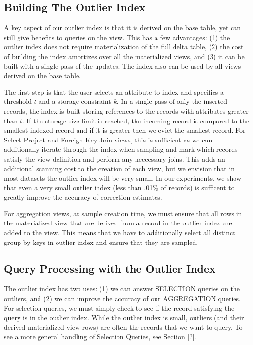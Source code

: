 \subsection{Building The Outlier Index}
A key aspect of our outlier index is that it is derived on the base table, yet 
can still give benefits to queries on the view.
This has a few advantages: (1) the outlier index does not require materialization of the full delta table,
(2) the cost of building the index amortizes over all the materialized views, and (3) it can be built with a 
single pass of the updates.
The index also can be used by all views derived on the base table.

The first step is that the user selects an attribute to index and specifies a threshold $t$ and a storage constraint $k$.
In a single pass of only the inserted records, the index is built storing references to the records with attributes greater than $t$.
If the storage size limit is reached, the incoming record is compared to the smallest indexed record and if it is greater then we evict the smallest record.
For Select-Project and Foreign-Key Join views, this is sufficient as we can additionally iterate through the index when sampling and mark 
which records satisfy the view definition and perform any neccessary joins. 
This adds an additional scanning cost to the creation of each view, but we envision that in most datasets the outlier index will be
very small.
In our experiments, we show that even a very small outlier index (less than .01\% of records) is sufficent to greatly improve the accuracy of
correction estimates.

For aggregation views, at sample creation time, we must ensure that all rows in the materialized view that are derived from a record in the outlier index are added to the view. 
This means that we have to additionally select all distinct group by keys in outlier index and ensure that they are sampled.

\subsection{Query Processing with the Outlier Index}
The outlier index has two uses: (1) we can answer SELECTION queries on the outliers, 
and (2) we can improve the accuracy of our AGGREGATION queries.
For selection queries, we must simply check to see if the record satisfying the query is in the outlier index.
While the outlier index is small, outliers (and their derived materialized view rows) are often the records that
we want to query.
To see a more general handling of Selection Queries, see Section [?].

